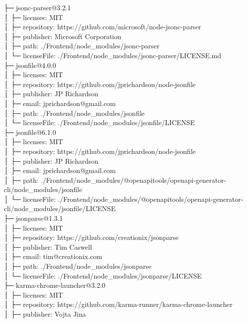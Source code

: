 ├─ jsonc-parser@3.2.1\\
│  ├─ licenses: MIT\\
│  ├─ repository: https://github.com/microsoft/node-jsonc-parser\\
│  ├─ publisher: Microsoft Corporation\\
│  ├─ path: ./Frontend/node\_modules/jsonc-parser\\
│  └─ licenseFile: ./Frontend/node\_modules/jsonc-parser/LICENSE.md\\
├─ jsonfile@4.0.0\\
│  ├─ licenses: MIT\\
│  ├─ repository: https://github.com/jprichardson/node-jsonfile\\
│  ├─ publisher: JP Richardson\\
│  ├─ email: jprichardson@gmail.com\\
│  ├─ path: ./Frontend/node\_modules/jsonfile\\
│  └─ licenseFile: ./Frontend/node\_modules/jsonfile/LICENSE\\
├─ jsonfile@6.1.0\\
│  ├─ licenses: MIT\\
│  ├─ repository: https://github.com/jprichardson/node-jsonfile\\
│  ├─ publisher: JP Richardson\\
│  ├─ email: jprichardson@gmail.com\\
│  ├─ path: ./Frontend/node\_modules/@openapitools/openapi-generator-cli/node\_modules/jsonfile\\
│  └─ licenseFile: ./Frontend/node\_modules/@openapitools/openapi-generator-cli/node\_modules/jsonfile/LICENSE\\
├─ jsonparse@1.3.1\\
│  ├─ licenses: MIT\\
│  ├─ repository: https://github.com/creationix/jsonparse\\
│  ├─ publisher: Tim Caswell\\
│  ├─ email: tim@creationix.com\\
│  ├─ path: ./Frontend/node\_modules/jsonparse\\
│  └─ licenseFile: ./Frontend/node\_modules/jsonparse/LICENSE\\
├─ karma-chrome-launcher@3.2.0\\
│  ├─ licenses: MIT\\
│  ├─ repository: https://github.com/karma-runner/karma-chrome-launcher\\
│  ├─ publisher: Vojta Jina\\
